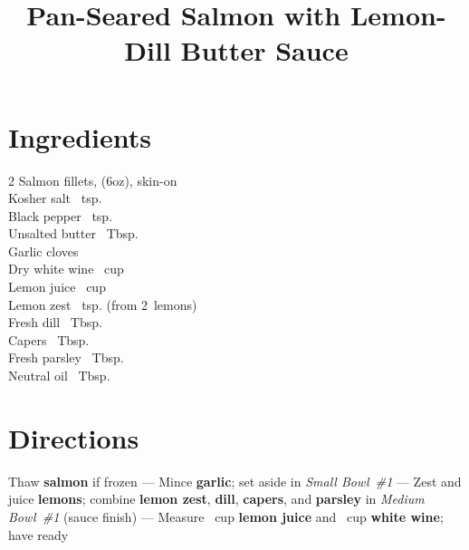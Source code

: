 \documentclass[11pt,letterpaper]{article}
\title{Pan-Seared Salmon with Lemon-Dill Butter Sauce}
\author{}
\date{}
\begin{document}
\maketitle
\thispagestyle{empty}


\section*{Ingredients}
\setlength{\columnsep}{20pt}
\begin{multicols}{2}
\noindent
    Salmon fillets, (6oz), skin-on  \\
    Kosher salt ~tsp. \\
    Black pepper \dotfill {}~tsp. \\
    Unsalted butter ~Tbsp. \\
    Garlic cloves  \\
    \columnbreak
    Dry white wine \dotfill {}~cup \\
    Lemon juice \dotfill {}~cup \\
    Lemon zest ~tsp. (from 2~lemons) \\
    Fresh dill ~Tbsp. \\
    Capers ~Tbsp. \\
    Fresh parsley ~Tbsp. \\
    Neutral oil ~Tbsp. \\
\end{multicols}

\section*{Directions}

\noindent
Thaw \textbf{salmon} if frozen ---
Mince \textbf{garlic}; set aside in \textit{Small Bowl~\#1} ---
Zest and juice \textbf{lemons}; combine \textbf{lemon zest}, \textbf{dill}, \textbf{capers}, and \textbf{parsley} in \textit{Medium Bowl~\#1} (sauce finish) ---
Measure ~cup \textbf{lemon juice} and ~cup \textbf{white wine}; have ready
\end{document}
